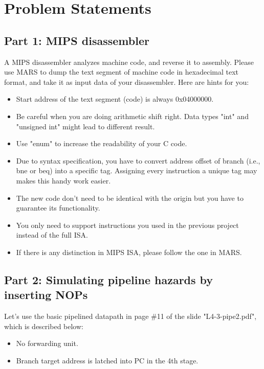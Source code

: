 \documentclass{article}
\begin{document}
\section{Problem Statements}

\subsection{Part 1: MIPS disassembler}

A MIPS disassembler analyzes machine code, and reverse it to assembly. Please use MARS to dump the text segment of machine code in hexadecimal text format, and take it as input data of your disassembler. Here are hints for you:

\begin{itemize}
    \item Start address of the text segment (code) is always 0x04000000.
    \item Be careful when you are doing arithmetic shift right. Data types "int" and "unsigned int" might lead to different result.
    \item Use "enum" to increase the readability of your C code.
    \item Due to syntax specification, you have to convert address offset of branch (i.e., bne or beq) into a specific tag. Assigning every instruction a unique tag may makes this handy work easier.
    \item The new code don't need to be identical with the origin but you have to guarantee its functionality.
    \item You only need to support instructions you used in the previous project instead of the full ISA.
    \item If there is any distinction in MIPS ISA, please follow the one in MARS.
\end{itemize}


%
%



\subsection{Part 2: Simulating pipeline hazards by inserting NOPs}

Let's use the basic pipelined datapath in page \#11 of the slide "L4-3-pipe2.pdf", which is described below:
\begin{itemize}
    \item No forwarding unit.
    \item Branch target address is latched into PC in the 4th stage.
\end{itemize}
\end{document}
